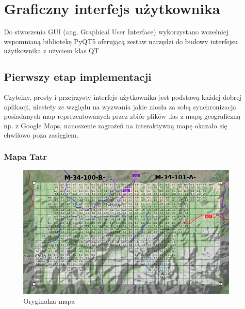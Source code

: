 \chapter{Graficzny interfejs użytkownika}
Do stworzenia GUI (ang. Graphical User Interface) wykorzystano wcześniej wspomnianą bibliotekę PyQT5 oferującą zestaw narzędzi do budowy interfejsu użytkownika z użyciem klas QT
\section{Pierwszy etap implementacji}
Czytelny, prosty i przejrzysty interfejs użytkownika jest podstawą każdej dobrej aplikacji, niestety ze względu na wyzwania jakie niosła za sobą synchronizacja posiadanych map reprezentowanych przez zbiór plików .las z mapą geograficzną np. z Google Maps, nanoszenie zagrożeń na interaktywną mapę okazało się chwilowo poza zasięgiem.
\subsection{Mapa Tatr}
\begingroup
\begin{figure}[h]
	\centering
	\includegraphics[scale=0.4]{tlo.png}
	\caption{Oryginalna mapa}
\end{figure}
\endgroup

